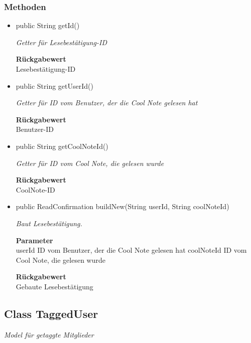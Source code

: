 \documentclass[a4paper]{scrreprt}
\begin{document}
    \subsubsection{Methoden}
    \begin{itemize}
    	\item{public String getId()}
    	
    	\textit{Getter für Lesebestätigung-ID}
    	
    	
    	
    	\textbf{Rückgabewert} \\
    	Lesebestätigung-ID        \item{public String getUserId()}
    	
    	\textit{Getter für ID vom Benutzer, der die Cool Note gelesen hat}
    	
    	
    	
    	\textbf{Rückgabewert} \\
    	Benutzer-ID        \item{public String getCoolNoteId()}
    	
    	\textit{Getter für ID vom Cool Note, die gelesen wurde}
    	
    	
    	
    	\textbf{Rückgabewert} \\
    	CoolNote-ID        \item{public ReadConfirmation buildNew(String userId, String coolNoteId)}
    	
    	\textit{Baut Lesebestätigung.}
    	
    	\textbf{Parameter} \\
    	userId ID vom Benutzer, der die Cool Note gelesen hat
    	coolNoteId ID vom Cool Note, die gelesen wurde
    	
    	\textbf{Rückgabewert} \\
    	Gebaute Lesebestätigung
    \end{itemize}
    \subsection{Class TaggedUser}
    \textit{Model für getaggte Mitglieder}
\end{document}
